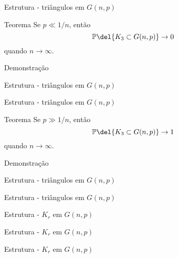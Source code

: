 \documentclass{beamer}
\begin{document}
    \begin{frame}{Estrutura - triângulos em $G(n,p)$}
        \vspace{-0.5cm}
        \begin{block}{Teorema}
            Se $p\ll 1/n$, então
            \[ \mathbb{P}\del{K_3\subset G(n,p)}\to 0 \]
            quando $n\to \infty$.
        \end{block}

        \begin{exampleblock}{Demonstração}
        \end{exampleblock}

        \vspace{\stretch3}

    \end{frame}

    \begin{frame}{Estrutura - triângulos em $G(n,p)$}

    \end{frame}

    \begin{frame}{Estrutura - triângulos em $G(n,p)$}
        \vspace{-0.5cm}
        \begin{block}{Teorema}
            Se $p\gg 1/n$, então
            \[ \mathbb{P}\del{K_3\subset G(n,p)}\to 1 \]
            quando $n\to\infty$.
        \end{block}

        \begin{exampleblock}{Demonstração}
        \end{exampleblock}

        \vspace{\stretch3}

    \end{frame}

    \begin{frame}{Estrutura - triângulos em $G(n,p)$}

    \end{frame}

    \begin{frame}{Estrutura - triângulos em $G(n,p)$}

    \end{frame}

    \begin{frame}{Estrutura - $K_r$ em $G(n,p)$}

    \end{frame}

    \begin{frame}{Estrutura - $K_r$ em $G(n,p)$}

    \end{frame}

    \begin{frame}{Estrutura - $K_r$ em $G(n,p)$}

    \end{frame}



\end{document}
